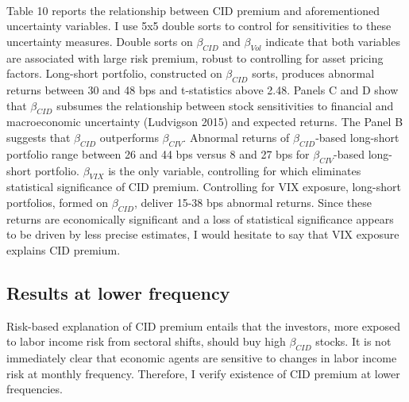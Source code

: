 \documentclass[12pt]{article}
\begin{document}
\paragraph{}
Table 10 reports the relationship between CID premium and aforementioned uncertainty variables. I use 5x5 double sorts to control for sensitivities to these uncertainty measures. Double sorts on $\beta_{CID}$ and $\beta_{Vol}$ indicate that both variables are associated with large risk premium, robust to controlling for asset pricing factors. Long-short portfolio, constructed on $\beta_{CID}$ sorts, produces abnormal returns between 30 and 48 bps and t-statistics above 2.48. Panels C and D show that $\beta_{CID}$ subsumes the relationship between stock sensitivities to financial and macroeconomic uncertainty (Ludvigson 2015) and expected returns. 
The Panel B suggests that $\beta_{CID}$ outperforms $\beta_{CIV}$. Abnormal returns of $\beta_{CID}$-based long-short portfolio range between 26 and 44 bps versus 8 and 27 bps for $\beta_{CIV}$-based long-short portfolio. $\beta_{VIX}$ is the only variable, controlling for which eliminates statistical significance of CID premium. Controlling for VIX exposure, long-short portfolios, formed on $\beta_{CID}$, deliver 15-38 bps abnormal returns. Since these returns are economically significant and a loss of statistical significance appears to be driven by less precise estimates, I would hesitate to say that VIX exposure explains CID premium.

\subsection{Results at lower frequency}

Risk-based explanation of CID premium entails that the investors, more exposed to labor income risk from sectoral shifts, should buy high $\beta_{CID}$ stocks. It is not immediately clear that economic agents are sensitive to changes in labor income risk at monthly frequency. Therefore, I verify existence of CID premium at lower frequencies.
\end{document}
